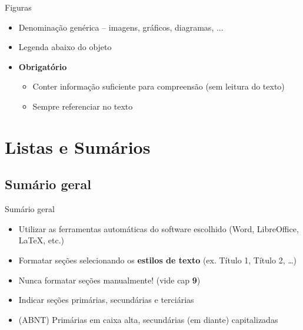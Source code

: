 \documentclass{beamer}
\begin{document}
\begin{frame}{\scriptsize Figuras}
  \begin{itemize}
    \footnotesize
  \item Denominação genérica -- {\scriptsize imagens, gráficos, diagramas,} ...
  \item Legenda abaixo do objeto
    \bigskip
  \item \alert{\bf Obrigatório}
    \begin{itemize}
      \scriptsize
    \item Conter informação suficiente para compreensão ({\tiny sem leitura do texto})
    \item Sempre referenciar no texto
    \end{itemize}
  \end{itemize}
\end{frame}

\section[Sumários]{Listas e Sumários}

\subsection{Sumário geral}

\begin{frame}{\scriptsize Sumário geral}
  \begin{itemize}
  \item Utilizar as ferramentas automáticas do software escolhido
    (Word, LibreOffice, \LaTeX, etc.)
  \item Formatar seções selecionando os {\bf estilos de texto}
    (ex. Título 1, Título 2, \ldots)
  \item \alert{Nunca} formatar seções manualmente! (vide cap {\bf 9})
  \item Indicar seções primárias, secundárias e terciárias
  \item (ABNT) Primárias em caixa alta, secundárias (em diante)
    capitalizadas
  \end{itemize}
\end{frame}
\end{document}
